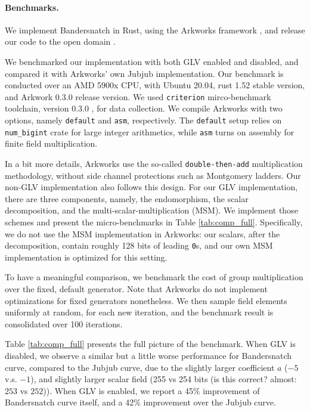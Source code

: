 \documentclass{article}
\newcommand{\SM}[1]{\color{blue}#1\color{black}}
\newcommand{\ZZ}[1]{\color{cyan}#1\color{black}}
\theoremstyle{definition}
\begin{document}
\paragraph{Benchmarks.}
We implement Bandersnatch in Rust, using the Arkworks framework \cite{arkworks}, 
and release our code to the open domain \cite{arkworks,bandersnatch-rust}. 

We benchmarked our implementation with both GLV enabled and disabled, and 
compared it with Arkworks' own Jubjub implementation. 
Our benchmark is conducted over an AMD 5900x CPU, with Ubuntu 20.04,
rust 1.52 stable version, and Arkwork 0.3.0 release version.
We used \texttt{criterion} mirco-benchmark toolchain,  version 0.3.0 \cite{criterion},
for data collection. We compile Arkworks with two options, namely
\texttt{default} and \texttt{asm}, respectively.
The \texttt{default} setup relies on \texttt{num\_bigint} crate for 
large integer arithmetics, while \texttt{asm}
turns on assembly for finite field multiplication.


In a bit more details, Arkworks use the so-called
\texttt{double-then-add}
multiplication methodology, without side channel protections such 
as Montgomery ladders. Our non-GLV implementation also follows
this design. For our GLV implementation, there are three components,
namely, the endomorphism, the scalar decomposition, and the
multi-scalar-multiplication (MSM). We implement those schemes and 
present the micro-benchmarks in Table \ref{tab:comp_full}.
Specifically, we do not use the MSM implementation in Arkworks:
our scalars, after the decomposition, contain roughly 128 bits
of leading \texttt{0}s, and our own MSM implementation is 
optimized for this setting.

To have a meaningful comparison, we benchmark
the cost of group multiplication over the fixed, default generator.
Note that Arkworks do not implement optimizations for 
fixed generators nonetheless. We then sample field elements 
uniformly at random, for each new iteration, and the benchmark
result is consolidated over 100 iterations.

Table \ref{tab:comp_full} presents the full picture of the benchmark.
When GLV is disabled, we observe a similar but a little worse 
performance for Bandersnatch curve, compared to
the 
Jubjub curve, due to the slightly larger coefficient 
$a$ ($-5$ v.s. $-1$), 
and slightly larger scalar field (255 vs 254 bits (\ZZ{is this
  correct?} \SM{almost: $253$ vs $252$})).
When GLV is enabled, we report a 45\% improvement of Bandersnatch curve
itself, and a 42\% improvement over the Jubjub curve.
\end{document}
